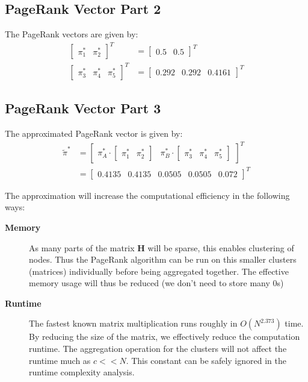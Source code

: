 \documentclass[]{article}
\begin{document}
\subsection{PageRank Vector Part 2}

The PageRank vectors are given by:
\begin{align*}
	\begin{bmatrix}
		\pi_1^* & \pi_2^*
	\end{bmatrix}^T 
	&=
	\begin{bmatrix}
		0.5 & 0.5
	\end{bmatrix}^T 
	\\
	\begin{bmatrix}
		\pi_3^* & \pi_4^* & \pi_5^*
	\end{bmatrix}^T 
	&=
	\begin{bmatrix}
		0.292 & 0.292 & 0.4161
	\end{bmatrix}^T 
\end{align*}

\subsection{PageRank Vector Part 3}

The approximated PageRank vector is given by:
\begin{align*}
	\tilde{\pi}^* &= \begin{bmatrix}
		\pi^*_A \cdot \begin{bmatrix}
			\pi_1^* & \pi_2^*
		\end{bmatrix}
		&
		\pi^*_B \cdot \begin{bmatrix}
			\pi_3^* & \pi_4^* & \pi_5^*
		\end{bmatrix} 
	\end{bmatrix}^T 
	\\
	&= \begin{bmatrix}
	0.4135 & 0.4135 & 0.0505 & 0.0505 & 0.072
	\end{bmatrix}^T 
\end{align*}

The approximation will increase the computational efficiency in the following ways:
\begin{description}
	\item[\textbf{Memory}] As many parts of the matrix $\mathbf{H}$ will be sparse, this enables clustering of nodes.
	Thus the PageRank algorithm can be run on this smaller clusters (matrices) individually before being aggregated together. The effective memory usage will thus be reduced (we don't need to store many 0s)
	\item[\textbf{Runtime}] The fastest known matrix multiplication runs roughly in $O(N^{2.373})$ time. By reducing the size of the matrix, we effectively reduce the computation runtime. The aggregation operation for the clusters will not affect the runtime much as $c << N$. This constant can be safely ignored in the runtime complexity analysis.
\end{description}
\end{document}
